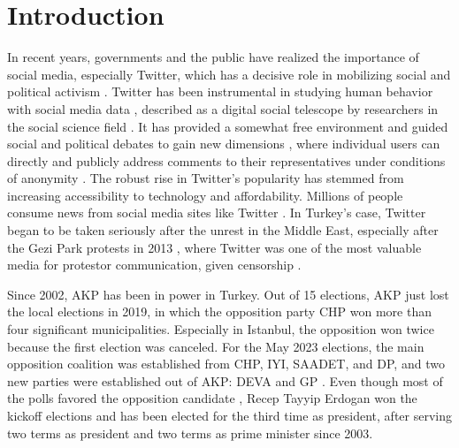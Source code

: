
\chapter{Introduction}\label{chapter:introduction}

In recent years, governments and the public have realized the importance of social media, 
especially Twitter, which has a decisive role in mobilizing social and political activism 
\parencite{uysal_turkeys_twitter_public_diplomacy_2019}. 
Twitter has been instrumental in studying human behavior with social media data 
\parencite{pfeffer_twitter_24_Hours_just_another_day_2023}, 
described as a digital social telescope by researchers in the social science field 
\parencite{mejova_twitter_2015_social_telescope}. 
It has provided a somewhat free environment and guided social and political debates to 
gain new dimensions \parencite{yerlikaya_social_media_manipulation_politics_2020}, 
where individual users can directly and publicly address comments to their representatives under 
conditions of anonymity \parencite{theocharis_twitter_political_incivility_2020}. The robust rise 
in Twitter's popularity has stemmed from increasing accessibility to technology and affordability. 
Millions of people consume news from social media sites like Twitter \parencite{anwar_analyzing_twitter_BERT_QAnon_2021}. 
In Turkey's case, Twitter began to be taken seriously after the unrest in the Middle East, 
especially after the Gezi Park protests in 2013 \parencite{zaharna_uysal_social_media_2016}, 
where Twitter was one of the most valuable media for protestor communication, given censorship 
\parencite{ogan__varol_twitter_gezi_park_2017}.

Since 2002, \ac{AKP} has been in power in Turkey. Out of 15 elections, \ac{AKP} just lost the 
local elections in 2019, in which the opposition party \ac{CHP} won more than four significant municipalities. 
Especially in Istanbul, the opposition won twice because the first election was canceled. 
For the May 2023 elections, the main opposition coalition was established from \ac{CHP}, \ac{IYI}, \ac{SAADET}, 
and \ac{DP}, and two new parties were established out of \ac{AKP}: \ac{DEVA} and \ac{GP} 
\parencite{Atila_medyascope_tr_secim_tarihi_2022}. 
Even though most of the polls favored the opposition candidate \parencite{Saç_Çoban_teyit_anketler_2023}, 
Recep Tayyip Erdogan won the kickoff elections and has been elected for the third time as president, after serving two terms as president and two terms as prime minister since 2003.


